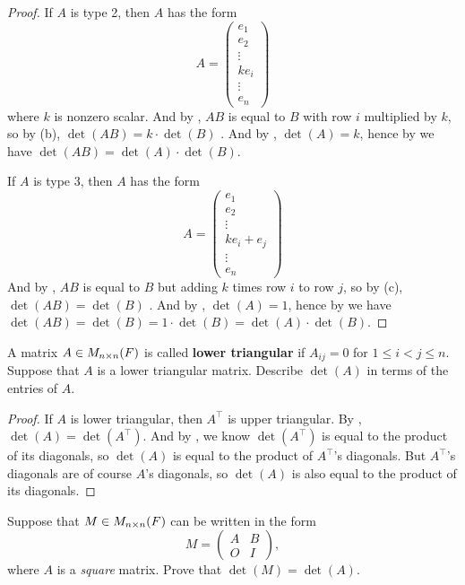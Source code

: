 \begin{proof}
If \(A\) is type 2, then \(A\) has the form
\[
    A = \begin{pmatrix}
        e_1 \\ e_2 \\ \vdots \\ k e_i \\ \vdots \\ e_n
    \end{pmatrix}
\]
where \(k\) is nonzero scalar.
And by , \(AB\) is equal to \(B\) with row \(i\) multiplied by \(k\), so by (b), \(\det(AB) = k \cdot \det(B)\) .
And by , \(\det(A) = k\), hence by  we have \(\det(AB) = \det(A) \cdot \det(B)\).

If \(A\) is type 3, then \(A\) has the form
\[
    A = \begin{pmatrix}
        e_1 \\ e_2 \\ \vdots \\ k e_i + e_j \\ \vdots \\ e_n
    \end{pmatrix}
\]
And by , \(AB\) is equal to \(B\) but adding \(k\) times row \(i\) to row \(j\), so by (c), \(\det(AB) = \det(B)\) .
And by , \(\det(A) = 1\), hence by  we have \(\det(AB) = \det(B) = 1 \cdot \det(B) = \det(A) \cdot \det(B)\).
\end{proof}

\begin{exercise} \label{exercise 4.3.19}
A matrix \(A \in M_{n \times n}(F)\) is called \textbf{lower triangular} if \(A_{ij} = 0\) for \(1 \le i < j \le n\).
Suppose that \(A\) is a lower triangular matrix.
Describe \(\det(A)\) in terms of the entries of \(A\).
\end{exercise}

\begin{proof}
If \(A\) is lower triangular, then \(A^\top\) is upper triangular.
By , \(\det(A) = \det(A^\top)\).
And by , we know \(\det(A^\top)\) is equal to the product of its diagonals, so \(\det(A)\) is equal to the product of \(A^\top\)'s diagonals.
But \(A^\top\)'s diagonals are of course \(A\)'s diagonals, so \(\det(A)\) is also equal to the product of its diagonals.
\end{proof}

\begin{exercise} \label{exercise 4.3.20}
Suppose that \(M \in M_{n \times n}(F)\) can be written in the form
\[
    M = \begin{pmatrix} A & B \\ O & I \end{pmatrix},
\]
where \(A\) is a \emph{square} matrix.
Prove that \(\det(M) = \det(A)\).
\end{exercise}

